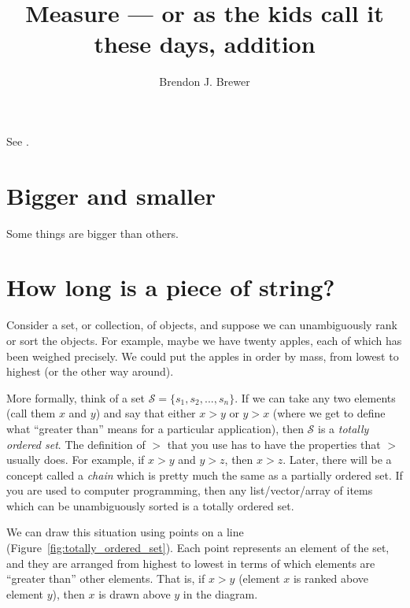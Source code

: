 \documentclass[a4paper, 12pt]{article}
\title{Measure --- or as the kids call it these days, addition}
\author{Brendon J. Brewer}
\date{}
\begin{document}
\maketitle

\setlength{\parindent}{0pt}
\setlength{\parskip}{8pt}

See \citet{knuth2016deeper}.

\section{Bigger and smaller}
Some things are bigger than others.

\section{How long is a piece of string?}

Consider a set, or collection, of objects, and suppose we can
unambiguously rank or sort the objects. For example, maybe we
have twenty apples, each of which has been weighed precisely.
We could put the apples in order by mass, from lowest to highest (or
the other way around).

More formally, think of a set $\mathcal{S} = \{s_1, s_2, ..., s_n\}$.
If we can take any two elements
(call them $x$ and $y$) and say that either $x > y$ or $y > x$ (where
we get to define what ``greater than'' means for a particular application),
then $\mathcal{S}$ is a {\em totally ordered set}. The definition of
$>$ that you use has to have the properties that $>$ usually does. For
example, if $x > y$ and $y > z$, then $x > z$. 
Later, there will be a concept called a {\em chain} which is pretty much
the same as a partially ordered set.
If you are used to computer programming, then any
list/vector/array of items which can be unambiguously sorted
is a totally ordered set.

We can draw this situation using points on a line
(Figure~\ref{fig:totally_ordered_set}).
Each point
represents an element of the set, and they are arranged from highest
to lowest in terms of which elements are ``greater than'' other elements.
That is, if $x > y$ (element
$x$ is ranked above element $y$), then $x$ is drawn above $y$ in the
diagram.
\end{document}
